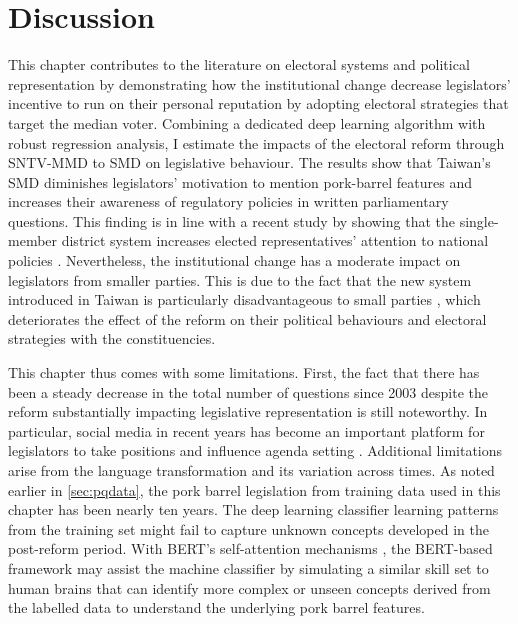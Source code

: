 \section*{\centering Discussion}

This chapter contributes to the literature on electoral systems and political representation by demonstrating how the institutional change decrease legislators' incentive to run on their personal reputation by adopting electoral strategies that target the median voter. Combining a dedicated deep learning algorithm with robust regression analysis, I estimate the impacts of the electoral reform through SNTV-MMD to SMD on legislative behaviour. The results show that Taiwan's SMD diminishes legislators' motivation to mention pork-barrel features and increases their awareness of regulatory policies in written parliamentary questions. This finding is in line with a recent study by \citet{Catalinac2016, Ishima2020} showing that the single-member district system increases elected representatives' attention to national policies \citep{Catalinac2016}. Nevertheless, the institutional change has a moderate impact on legislators from smaller parties. This is due to the fact that the new system introduced in Taiwan is particularly disadvantageous to small parties \citep{Duverger1954, Reed2001, Huang2017, Bawn2003}, which deteriorates the effect of the reform on their political behaviours and electoral strategies with the constituencies. 

This chapter thus comes with some limitations. First, the fact that there has been a steady decrease in the total number of questions since 2003 despite the reform substantially impacting legislative representation is still noteworthy. In particular, social media in recent years has become an important platform for legislators to take positions and influence agenda setting \citep{Barbera2015, Barbera2019, Schurmann2022}. Additional limitations arise from the language transformation and its variation across times. As noted earlier in \autoref{sec:pqdata}, the pork barrel legislation from training data used in this chapter has been nearly ten years. The deep learning classifier learning patterns from the training set might fail to capture unknown concepts developed in the post-reform period. With BERT's self-attention mechanisms \citep{Vaswani2017}, the BERT-based framework may assist the machine classifier by simulating a similar skill set to human brains that can identify more complex or unseen concepts derived from the labelled data to understand the underlying pork barrel features.

